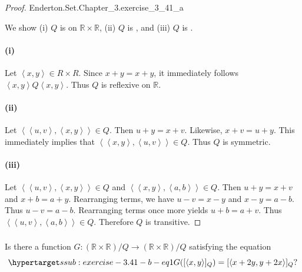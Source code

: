 \documentclass{report}
\newcommand{\pair}[1]{\left< #1 \right>}
\begin{document}
\begin{proof}

    {Enderton.Set.Chapter\_3.exercise\_3\_41\_a}

  We show (i) $Q$ is  on $\mathbb{R} \times \mathbb{R}$,
    (ii) $Q$ is , and (iii) $Q$ is
    .

  \paragraph{(i)}%

    Let $\pair{x, y} \in R \times R$.
    Since $x + y = x + y$, it immediately follows $\pair{x, y}Q\pair{x, y}$.
    Thus $Q$ is reflexive on $\mathbb{R}$.

  \paragraph{(ii)}%

    Let $\pair{\pair{u, v}, \pair{x, y}} \in Q$.
    Then $u + y = x + v$.
    Likewise, $x + v = u + y$.
    This immediately implies that $\pair{\pair{x, y}, \pair{u, v}} \in Q$.
    Thus $Q$ is symmetric.

  \paragraph{(iii)}%

    Let $\pair{\pair{u, v}, \pair{x, y}} \in Q$ and
      $\pair{\pair{x, y}, \pair{a, b}} \in Q$.
    Then $u + y = x + v$ and $x + b = a + y$.
    Rearranging terms, we have $u - v = x - y$ and $x - y = a - b$.
    Thus $u - v = a - b$.
    Rearranging terms once more yields $u + b = a + v$.
    Thus $\pair{\pair{u, v}, \pair{a, b}} \in Q$.
    Therefore $Q$ is transitive.

\end{proof}

\subsubsection{}%

Is there a function $G \colon (\mathbb{R} \times \mathbb{R}) / Q
  \rightarrow (\mathbb{R} \times \mathbb{R}) / Q$ satisfying the equation
  \begin{equation}
    \hyperlabel{ssub:exercise-3.41-b-eq1}
    G([\pair{x, y}]_Q) = [\pair{x + 2y, y + 2x}]_Q?
  \end{equation}
\end{document}
